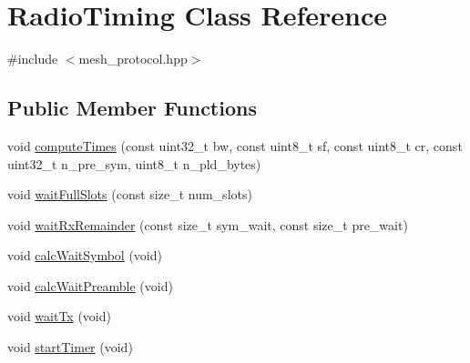 \hypertarget{classRadioTiming}{}\section{Radio\+Timing Class Reference}
\label{classRadioTiming}


{\ttfamily \#include $<$mesh\+\_\+protocol.\+hpp$>$}

\subsection*{Public Member Functions}
\begin{DoxyCompactItemize}
\item 
void \hyperlink{classRadioTiming_a8889214bcfb05975e8ed121a59ffb06c}{compute\+Times} (const uint32\+\_\+t bw, const uint8\+\_\+t sf, const uint8\+\_\+t cr, const uint32\+\_\+t n\+\_\+pre\+\_\+sym, uint8\+\_\+t n\+\_\+pld\+\_\+bytes)
\item 
void \hyperlink{classRadioTiming_a5968dcc1c5dc7aa644e4fd4b3c44f373}{wait\+Full\+Slots} (const size\+\_\+t num\+\_\+slots)
\item 
void \hyperlink{classRadioTiming_ab794bed8927778ed17a9cbbfe1cf4a5f}{wait\+Rx\+Remainder} (const size\+\_\+t sym\+\_\+wait, const size\+\_\+t pre\+\_\+wait)
\item 
void \hyperlink{classRadioTiming_a763af2aa098f7b311c149dbf062d40a2}{calc\+Wait\+Symbol} (void)
\item 
void \hyperlink{classRadioTiming_ab88cd62548731862e0a24c986bf095bf}{calc\+Wait\+Preamble} (void)
\item 
void \hyperlink{classRadioTiming_a8451969371826cd733288652f5323053}{wait\+Tx} (void)
\item 
void \hyperlink{classRadioTiming_a20de4c0e271dcab020ab6fa999570855}{start\+Timer} (void)
\end{DoxyCompactItemize}
